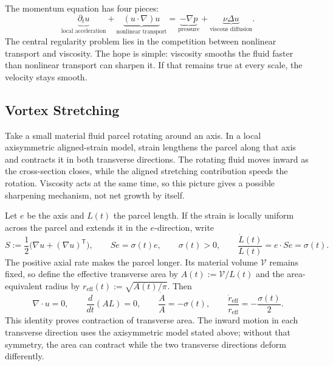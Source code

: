 
The momentum equation has four pieces:
\[
  \underbrace{\partial_t u}_{\text{local acceleration}}
  +
  \underbrace{(u\cdot\nabla)u}_{\text{nonlinear transport}}
  =
  \underbrace{-\nabla p}_{\text{pressure}}
  +
  \underbrace{\nu\Delta u}_{\text{viscous diffusion}}.
\]
The central regularity problem lies in the competition between nonlinear transport and viscosity.
The hope is simple: viscosity smooths the fluid faster than nonlinear transport can sharpen it.
If that remains true at every scale, the velocity stays smooth.

\subsection{Vortex Stretching}\label{sub:ThePerfectlyStretchingVortex}

Take a small material fluid parcel rotating around an axis. In a local axisymmetric aligned-strain model, strain lengthens the parcel along that axis and contracts it in both transverse directions. The rotating fluid moves inward as the cross-section closes, while the aligned stretching contribution speeds the rotation. Viscosity acts at the same time, so this picture gives a possible sharpening mechanism, not net growth by itself.

Let \(e\) be the axis and \(L(t)\) the parcel length. If the strain is locally uniform across the parcel and extends it in the \(e\)-direction, write
\[
  S:=\frac12\bigl(\nabla u+(\nabla u)^{\mathsf T}\bigr),
  \qquad
  Se=\sigma(t)e,
  \qquad
  \sigma(t)>0,
  \qquad
  \frac{\dot L(t)}{L(t)}
  =
  e\cdot Se
  =
  \sigma(t).
\]
The positive axial rate makes the parcel longer. Its material volume \(\mathcal V\) remains fixed, so define the effective transverse area by \(A(t):=\mathcal V/L(t)\) and the area-equivalent radius by \(r_{\mathrm{eff}}(t):=\sqrt{A(t)/\pi}\). Then
\[
  \nabla\cdot u=0,
  \qquad
  \frac{d}{dt}(A L)=0,
  \qquad
  \frac{\dot A}{A}=-\sigma(t),
  \qquad
  \frac{\dot r_{\mathrm{eff}}}{r_{\mathrm{eff}}}
  =
  -\frac{\sigma(t)}{2}.
\]
This identity proves contraction of transverse area. The inward motion in each transverse direction uses the axisymmetric model stated above; without that symmetry, the area can contract while the two transverse directions deform differently.

